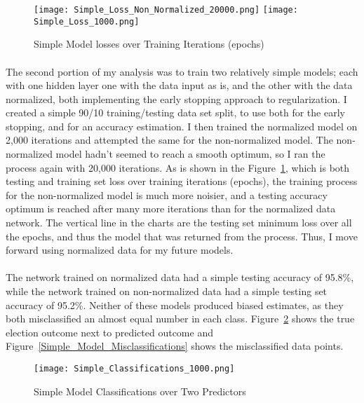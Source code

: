 \documentclass[11pt]{scrartcl} %
\begin{document}
\begin{figure}[h]
	\centering
	\texttt{[image: Simple\_Loss\_Non\_Normalized\_20000.png]}
	\texttt{[image: Simple\_Loss\_1000.png]}
	\caption{Simple Model losses over Training Iterations (epochs)}
	\label{Simple_Model_Losses}
\end{figure}

\paragraph{}
The second portion of my analysis was to train two relatively simple models; each with one hidden layer one with the data input as is, and the other with the data normalized, both implementing the early stopping approach to regularization. I created a simple 90/10 training/testing data set split, to use both for the early stopping, and for an accuracy estimation. I then trained the normalized model on 2,000 iterations and attempted the same for the non-normalized model. The non-normalized model hadn't seemed to reach a smooth optimum, so I ran the process again with 20,000 iterations. As is shown in the Figure~\ref{Simple_Model_Losses}, which is both testing and training set loss over training iterations (epochs), the training process for the non-normalized model is much more noisier, and a testing accuracy optimum is reached after many more iterations than for the normalized data network. The vertical line in the charts are the testing set minimum loss over all the epochs, and thus the model that was returned from the process. Thus, I move forward using normalized data for my future models.


\paragraph{}
The network trained on normalized data had a simple testing accuracy of 95.8\%, while the network trained on non-normalized data had a simple testing set accuracy of 95.2\%. Neither of these models produced biased estimates, as they both misclassified an almost equal number in each class. Figure~\ref{Simple_Model_Classifications} shows the true election outcome next to predicted outcome and Figure~\ref{Simple_Model_Misclassifications} shows the misclassified data points.



\begin{figure}[h]
	\centering
	\texttt{[image: Simple\_Classifications\_1000.png]}
	\caption{Simple Model Classifications over Two Predictors}
	\label{Simple_Model_Classifications}
\end{figure}
\end{document}
